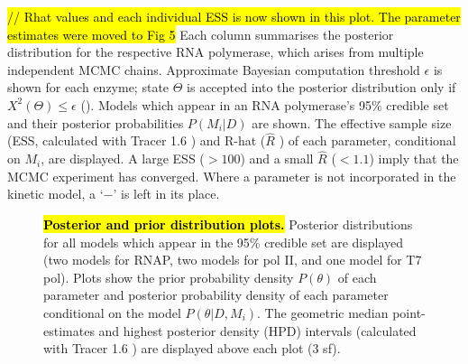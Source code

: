 \documentclass[10pt,letterpaper]{article}
\begin{document}
\begin{table}[!ht]
\begin{adjustwidth}{-2.25in}{0in}
{\begin{tabular}{|cc|cc|cc|c|}
\end{tabular}
}
\begin{flushleft} \textcolor{red}{\hl{// Rhat values and each individual ESS is now shown in this plot. The parameter estimates were moved to Fig 5}}  Each column summarises the posterior distribution for the respective RNA polymerase, which arises from multiple independent MCMC chains. Approximate Bayesian computation threshold $\epsilon$ is shown for each enzyme; state $\Theta$ is accepted into the posterior distribution only if $X^2(\Theta) \leq \epsilon$ (). Models which appear in an RNA polymerase's 95\% credible set and their posterior probabilities $P(M_i|D)$ are shown. The effective sample size (ESS, calculated with Tracer 1.6 \cite{rambaut2013tracer}) and R-hat ($\hat{R}$ \cite{gelman1992inference, brooks1998general, brooks2011handbook}) of each parameter, conditional on $M_i$, are displayed. A large ESS ($> 100$) and a small $\hat{R}$ ($< 1.1$) imply that the MCMC experiment has converged. Where a parameter is not incorporated in the kinetic model, a `$-$' is left in its place.
\end{flushleft}
\label{table1}
\end{adjustwidth}
\end{table}





\begin{figure}[!ht]
\caption{\hl{\textbf{Posterior and prior distribution plots.}} Posterior distributions for all models which appear in the 95\% credible set are displayed (two models for RNAP, two models for pol II, and one model for T7 pol). Plots show the prior probability density $P(\theta)$ of each parameter and posterior probability density of each parameter conditional on the model $P(\theta | D, M_i)$. The geometric median point-estimates and  highest posterior density (HPD) intervals (calculated with Tracer 1.6 \cite{rambaut2013tracer}) are displayed above each plot (3 sf). }
\label{fig5}
\end{figure}
\end{document}
